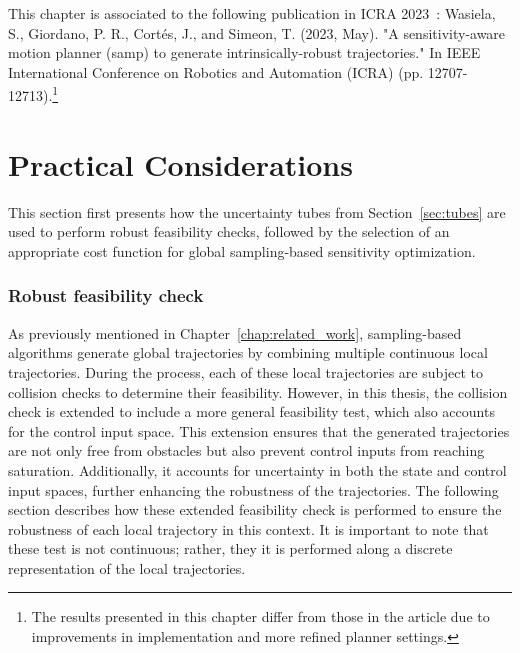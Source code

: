 This chapter is associated to the following publication in ICRA 2023~\cite{cSAMP}: Wasiela, S., Giordano, P. R., Cortés, J., and Simeon, T. (2023, May). "A sensitivity-aware motion planner (samp) to generate intrinsically-robust trajectories." In IEEE International Conference on Robotics and Automation (ICRA) (pp. 12707-12713).\footnote{The results presented in this chapter differ from those in the article due to improvements in implementation and more refined planner settings.}

\section{Practical Considerations}\label{sec:metrics}

This section first presents how the uncertainty tubes from Section~\ref{sec:tubes} are used to perform robust feasibility checks, followed by the selection of an appropriate cost function for global sampling-based sensitivity optimization.

\subsubsection{Robust feasibility check}\label{sec:robust_CC}

As previously mentioned in Chapter~\ref{chap:related_work}, sampling-based algorithms generate global trajectories by combining multiple continuous local trajectories.
During the process, each of these local trajectories are subject to collision checks to determine their feasibility.
However, in this thesis, the collision check is extended to include a more general feasibility test, which also accounts for the control input space. 
This extension ensures that the generated trajectories are not only free from obstacles but also prevent control inputs from reaching saturation. 
Additionally, it accounts for uncertainty in both the state and control input spaces, further enhancing the robustness of the trajectories.
The following section describes how these extended feasibility check is performed to ensure the robustness of each local trajectory in this context.
It is important to note that these test is not continuous; rather, they it is performed along a discrete representation of the local trajectories.

